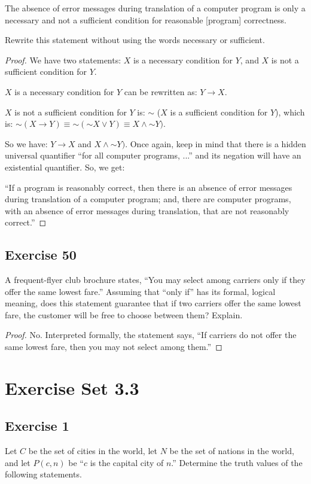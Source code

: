 \documentclass[14pt]{extarticle}
\begin{document}
The absence of error messages during translation of a computer program is only a necessary and not a sufficient condition for reasonable [program] correctness.

Rewrite this statement without using the words necessary or sufficient.

\begin{proof}
    We have two statements: $X$ is a necessary condition for $Y$, and $X$ is not a sufficient condition for $Y$.

    $X$ is a necessary condition for $Y$ can be rewritten as: $Y \to X$.

    $X$ is not a sufficient condition for $Y$ is: $\sim$ ($X$ is a sufficient condition for $Y$), which is: ${\sim (X \to Y)} \equiv {\sim({\sim X} \vee Y)} \equiv X \wedge {\sim Y})$.

    So we have: $Y \to X$ and $X \wedge {\sim Y})$. Once again, keep in mind that there is a hidden universal quantifier ``for all computer programs, ...'' and its negation will have an existential quantifier. So, we get:

    ``If a program is reasonably correct, then there is an absence of error messages during translation of a computer program; and, there are computer programs, with an absence of error messages during translation, that are not reasonably correct.''
\end{proof}

\subsection{Exercise 50}
A frequent-flyer club brochure states, “You may select among carriers only if they offer the same lowest fare.” Assuming that “only if” has its formal, logical meaning, does this statement guarantee that if two carriers offer the same lowest fare, the customer will be free to choose between them? Explain.

\begin{proof}
    No. Interpreted formally, the statement says, “If carriers do not offer the same lowest fare, then you may not select among them.”
\end{proof}

\section{Exercise Set 3.3}
\subsection{Exercise 1}
Let $C$ be the set of cities in the world, let $N$ be the set of nations in the world, and let $P(c, n)$ be “$c$ is the capital city of $n$.” Determine the truth values of the following statements.
\end{document}
